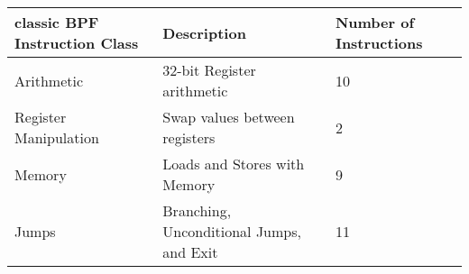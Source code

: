 \begin{tabular}{lll}
\toprule
classic BPF Instruction Class & Description & Number of Instructions\\
\midrule
  Arithmetic & 32-bit Register arithmetic & 10 \\
  Register Manipulation & Swap values between registers & 2 \\
  Memory & Loads and Stores with Memory & 9 \\
  Jumps & Branching, Unconditional Jumps, and Exit & 11 \\
\bottomrule
\end{tabular}

